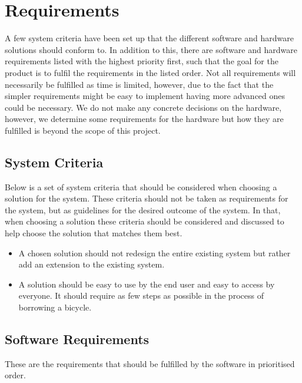 \section{Requirements}
A few system criteria have been set up that the different software and hardware solutions should conform to. 
In addition to this, there are software and hardware requirements listed with the highest priority first, such that the goal for the product is to fulfil the requirements in the listed order. 
Not all requirements will necessarily be fulfilled as time is limited, however, due to the fact that the simpler requirements might be easy to implement having more advanced ones could be necessary.
We do not make any concrete decisions on the hardware, however, we determine some requirements for the hardware but how they are fulfilled is beyond the scope of this project.

\subsection{System Criteria}\label{sec:systemCriteria}
Below is a set of system criteria that should be considered when choosing a solution for the system.
These criteria should not be taken as requirements for the system, but as guidelines for the desired outcome of the system.
In that, when choosing a solution these criteria should be considered and discussed to help choose the solution that matches them best.

\begin{itemize}
	\item A chosen solution should not redesign the entire existing system but rather add an extension to the existing system.
	\item A solution should be easy to use by the end user and easy to access by everyone. 
	It should require as few steps as possible in the process of borrowing a bicycle.
\end{itemize}

\subsection{Software Requirements}
These are the requirements that should be fulfilled by the software in prioritised order.

